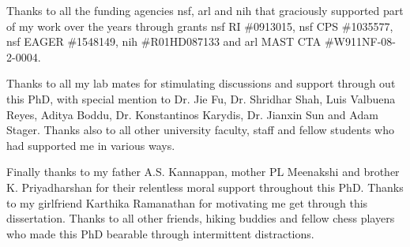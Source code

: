 Thanks to all the funding agencies \gls{nsf}, \gls{arl} and \gls{nih} that graciously supported part of my work over the years through grants \gls{nsf} RI \#0913015, \gls{nsf} CPS \#1035577, \gls{nsf} EAGER \#1548149, \gls{nih} \#R01HD087133 and \gls{arl} MAST CTA \#W911NF-08-2-0004.

Thanks to all my lab mates for stimulating discussions and support through out this PhD, with special mention to Dr. Jie Fu, Dr. Shridhar Shah, Luis Valbuena Reyes, Aditya Boddu, Dr. Konstantinos Karydis, Dr. Jianxin Sun and Adam Stager. Thanks also to all other university faculty, staff and fellow students who had supported me in various ways.

Finally thanks to my father A.S. Kannappan, mother PL Meenakshi and brother K. Priyadharshan for their relentless moral support throughout this PhD. Thanks to my girlfriend Karthika Ramanathan for motivating me get through this dissertation. Thanks to all other friends, hiking buddies and fellow chess players who made this PhD bearable through intermittent distractions.
